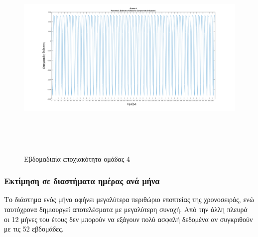 \begin{figure}[ht!]
\centering
\includegraphics[width=180mm, height=100mm]{../../plots/Trend_estimation/seasonal_4.png}
\caption{Εβδομαδιαία εποχιακότητα ομάδας 4}
\label{fig:season 4}
\end{figure}
\subsubsection{Εκτίμηση σε διαστήματα ημέρας ανά μήνα}
Το διάστημα ενός μήνα αφήνει μεγαλύτερα περιθώριο εποπτείας της χρονοσειράς, ενώ ταυτόχρονα δημιουργεί αποτελέσματα με μεγαλύτερη συνοχή. Από την άλλη πλευρά οι 12 μήνες του έτους δεν μπορούν να εξάγουν πολύ ασφαλή δεδομένα αν συγκριθούν με τις 52 εβδομάδες.


